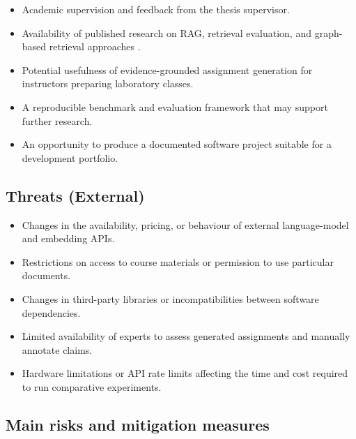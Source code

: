 \documentclass[12pt,a4paper]{article}
\begin{document}
\begin{itemize}
    \item Academic supervision and feedback from the thesis
    supervisor.

    \item Availability of published research on RAG, retrieval
    evaluation, and graph-based retrieval approaches
    \cite{lewis2020rag,guo2024lightrag,edge2024graphrag,
    salemi2024retrieval}.

    \item Potential usefulness of evidence-grounded assignment
    generation for instructors preparing laboratory classes.

    \item A reproducible benchmark and evaluation framework
    that may support further research.

    \item An opportunity to produce a documented software
    project suitable for a development portfolio.
\end{itemize}

\subsection{Threats (External)}

\begin{itemize}
    \item Changes in the availability, pricing, or behaviour
    of external language-model and embedding APIs.

    \item Restrictions on access to course materials or
    permission to use particular documents.

    \item Changes in third-party libraries or incompatibilities
    between software dependencies.

    \item Limited availability of experts to assess generated
    assignments and manually annotate claims.

    \item Hardware limitations or API rate limits affecting
    the time and cost required to run comparative experiments.
\end{itemize}

\subsection{Main risks and mitigation measures}
\end{document}
